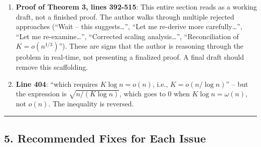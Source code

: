 \documentclass[
  12pt,
]{article}
\begin{document}
\begin{enumerate}
  \textbf{Line 285}: The author writes ``For a fixed true center
  \(\mu_k\), let \(j^*(k) = \arg\min_j \|\mu_k - \mu_j'\|_2\)'' -- but
  this ignores that the \(k\)-means assignment is based on
  \(\|\phi(x) - \mu_j'\|_2 = \|\mu_k + \varepsilon - \mu_j'\|_2\), not
  \(\|\mu_k - \mu_j'\|_2\). The argmin depends on \(\varepsilon\), so
  fixing \(j^*\) independent of \(\varepsilon\) is incorrect.
\item
  \textbf{Proof of Theorem 3, lines 392-515}: This entire section reads
  as a working draft, not a finished proof. The author walks through
  multiple rejected approaches (``Wait -- this suggests\ldots{}'', ``Let
  me re-derive more carefully\ldots{}'', ``Let me re-examine\ldots{}'',
  ``Corrected scaling analysis\ldots{}'', ``Reconciliation of
  \(K = o(n^{1/3})\)''). These are signs that the author is reasoning
  through the problem in real-time, not presenting a finalized proof. A
  final draft should remove this scaffolding.
\item
  \textbf{Line 404}: ``which requires \(K \log n = o(n)\), i.e.,
  \(K = o(n / \log n)\)'' -- but the expression is
  \(\sqrt{n/(K \log n)}\), which goes to 0 when
  \(K \log n = \omega(n)\), not \(o(n)\). The inequality is reversed.
\end{enumerate}

\begin{center}\rule{0.5\linewidth}{0.5pt}\end{center}

\subsection{5. Recommended Fixes for Each
Issue}\label{recommended-fixes-for-each-issue}
\end{document}

